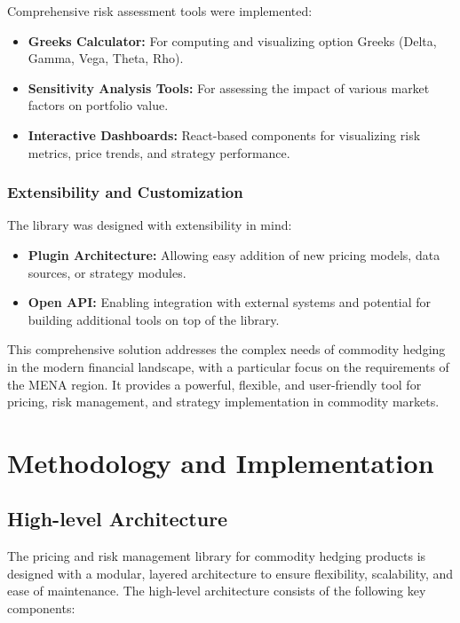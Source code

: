 \documentclass[12pt]{article}
\begin{document}
Comprehensive risk assessment tools were implemented:

\begin{itemize}
\item \textbf{Greeks Calculator:} For computing and visualizing option Greeks (Delta, Gamma, Vega, Theta, Rho).

\item \textbf{Sensitivity Analysis Tools:} For assessing the impact of various market factors on portfolio value.

\item \textbf{Interactive Dashboards:} React-based components for visualizing risk metrics, price trends, and strategy performance.
\end{itemize}

\subsubsection{Extensibility and Customization}

The library was designed with extensibility in mind:

\begin{itemize}
\item \textbf{Plugin Architecture:} Allowing easy addition of new pricing models, data sources, or strategy modules.

\item \textbf{Open API:} Enabling integration with external systems and potential for building additional tools on top of the library.
\end{itemize}

This comprehensive solution addresses the complex needs of commodity hedging in the modern financial landscape, with a particular focus on the requirements of the MENA region. It provides a powerful, flexible, and user-friendly tool for pricing, risk management, and strategy implementation in commodity markets.

\section{Methodology and Implementation}

\subsection{High-level Architecture}

The pricing and risk management library for commodity hedging products is designed with a modular, layered architecture to ensure flexibility, scalability, and ease of maintenance. The high-level architecture consists of the following key components:
\end{document}
